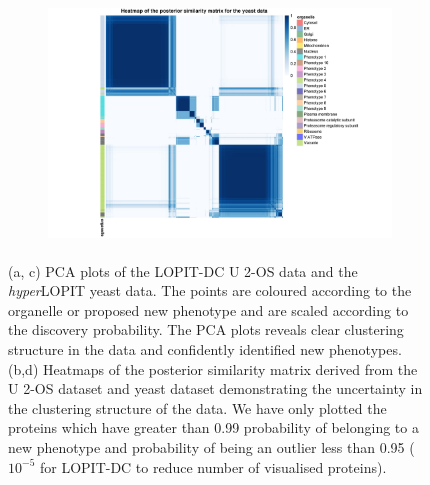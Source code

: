 \documentclass[12pt,english]{article}
\begin{document}
\begin{figure}
\begin{subfigure}[t]{0.5\textwidth}
	\centering
	\includegraphics[height=2.5in]{heatmapYeast.jpg}
	\caption{}
\end{subfigure}
\caption{(a, c) PCA plots of the LOPIT-DC U 2-OS data and the \textit{hyper}LOPIT yeast data. The points are coloured according to the organelle or proposed new phenotype and are scaled according to the discovery probability. The PCA plots reveals clear clustering structure in the data and confidently identified new phenotypes. (b,d) Heatmaps of the posterior similarity matrix derived from the U 2-OS dataset and yeast dataset demonstrating the uncertainty in the clustering structure of the data. We have only plotted the proteins which have greater than 0.99 probability of belonging to a new phenotype and probability of being an outlier less than 0.95 ($10^{-5}$ for LOPIT-DC to reduce number of visualised proteins).}
 \label{figure:DC}
\end{figure}
\end{document}
